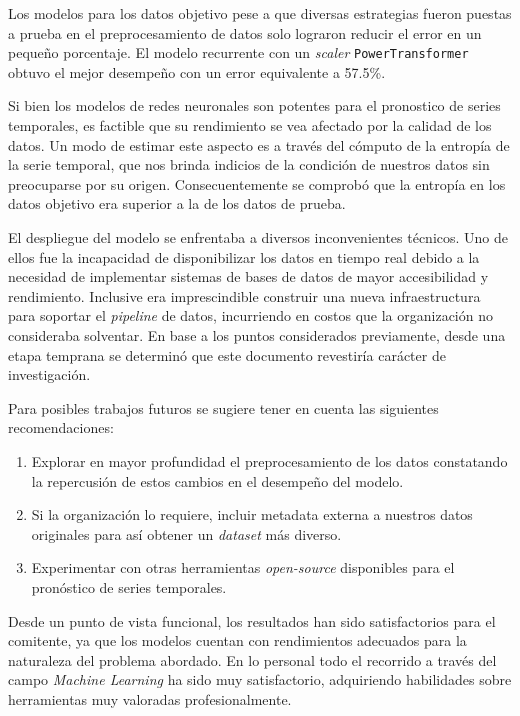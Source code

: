 \documentclass[a4paper,12pt]{article}
\begin{document}
		Los modelos para los datos objetivo pese a que diversas estrategias fueron puestas a prueba en el preprocesamiento de datos solo lograron reducir el error en un pequeño porcentaje. El modelo recurrente con un \textit{scaler} \texttt{PowerTransformer} obtuvo el mejor desempeño con un error equivalente a 57.5\%.
		
		
		
		Si bien los modelos de redes neuronales son potentes para el pronostico de series temporales, es factible que su rendimiento se vea afectado por la calidad de los datos. Un modo de estimar este aspecto es a través del cómputo de la entropía de la serie temporal, que nos brinda indicios de la condición de nuestros datos sin preocuparse por su origen. Consecuentemente se comprobó que la entropía en los datos objetivo era superior a la de los datos de prueba.
		
		El despliegue del modelo se enfrentaba a diversos inconvenientes técnicos. Uno de ellos fue la incapacidad de disponibilizar los datos en tiempo real debido a la necesidad de implementar sistemas de bases de datos de mayor accesibilidad y rendimiento. Inclusive era imprescindible construir una nueva infraestructura para soportar el \textit{pipeline} de datos, incurriendo en costos que la organización no consideraba solventar. En base a los puntos considerados previamente, desde una etapa temprana se determinó que este documento revestiría carácter de investigación.
		
		Para posibles trabajos futuros se sugiere tener en cuenta las siguientes recomendaciones:
		
		\begin{enumerate}[noitemsep, topsep=2pt]
			\item Explorar en mayor profundidad el preprocesamiento de los datos constatando la repercusión de estos cambios en el desempeño del modelo.
			\item Si la organización lo requiere, incluir metadata externa a nuestros datos originales para así obtener un \textit{dataset} más diverso.
			\item Experimentar con otras herramientas \textit{open-source} disponibles para el pronóstico de series temporales.
		\end{enumerate}
		
		Desde un punto de vista funcional, los resultados han sido satisfactorios para el comitente, ya que los modelos cuentan con rendimientos adecuados para la naturaleza del problema abordado. En lo personal todo el recorrido a través del campo \textit{Machine Learning} ha sido muy satisfactorio, adquiriendo habilidades sobre herramientas muy valoradas profesionalmente.
		
		\clearpage
		
		{}
		
		
\end{document}
